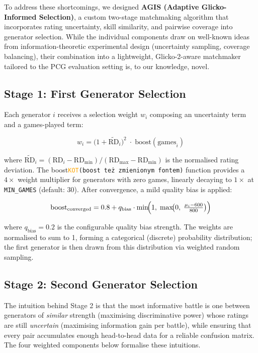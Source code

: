 \documentclass[shortabstract, mgr, english]{iithesis}
\newcommand{\DEBUG}[1]{{#1}} %
\newcommand{\KOT}[1]{\DEBUG{\tt{\textcolor{orange}{KOT}(}{#1}{)}}}
\begin{document}
To address these shortcomings, we designed \textbf{AGIS (Adaptive Glicko-Informed
Selection)}, a custom two-stage matchmaking algorithm that incorporates rating
uncertainty, skill similarity, and pairwise coverage into generator selection.
While the individual components draw on well-known ideas from information-theoretic
experimental design (uncertainty sampling, coverage balancing), their combination
into a lightweight, Glicko-2-aware matchmaker tailored to the PCG evaluation setting
is, to our knowledge, novel.

\subsection{Stage 1: First Generator Selection}
\label{subsec:sd-agis-stage1}

Each generator $i$ receives a selection weight $w_i$ composing an uncertainty term and
a games-played term:

\begin{equation}
\label{eq:agis-w1}
w_i = \bigl(1 + \widetilde{\text{RD}}_i\bigr)^2 \;\cdot\; \text{boost}(\text{games}_i)
\end{equation}

where $\widetilde{\text{RD}}_i = (\text{RD}_i - \text{RD}_{\min}) / (\text{RD}_{\max} -
\text{RD}_{\min})$ is the normalised rating deviation. The boost\KOT{boost też zmienionym fontem} function provides a $4\times$
weight multiplier for generators with zero games, linearly decaying to $1\times$ at
\texttt{MIN\_GAMES} (default: 30). After convergence, a mild quality bias is applied:

\begin{equation}
\text{boost}_{\text{converged}} = 0.8 + q_{\text{bias}} \cdot
\min\!\Bigl(1,\;\max\!\bigl(0,\;\tfrac{\mu_i - 600}{800}\bigr)\Bigr)
\end{equation}

where $q_{\text{bias}} = 0.2$ is the configurable quality bias strength. The weights
are normalised to sum to 1, forming a categorical (discrete) probability distribution;
the first generator is then drawn from this distribution via weighted random sampling.

\subsection{Stage 2: Second Generator Selection}
\label{subsec:sd-agis-stage2}

The intuition behind Stage 2 is that the most informative battle is one between
generators of \emph{similar} strength (maximising discriminative power) whose ratings
are still \emph{uncertain} (maximising information gain per battle), while ensuring
that every pair accumulates enough head-to-head data for a reliable confusion matrix.
The four weighted components below formalise these intuitions.
\end{document}

